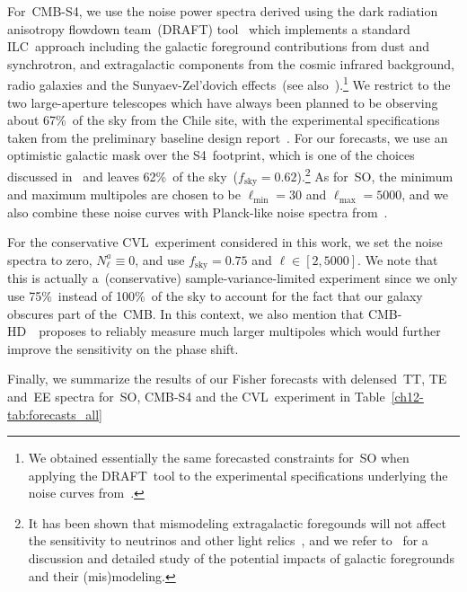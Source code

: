 \begin{subappendices}
For~\mbox{CMB-S4}, we use the noise power spectra derived using the dark radiation anisotropy flowdown team~(DRAFT) tool~\cite{CMB-S4:inprep, Raghunathan:draft} which implements a standard ILC~approach including the galactic foreground contributions from dust and synchrotron, and extragalactic components from the cosmic infrared background, radio galaxies and the Sunyaev-Zel'dovich effects~(see also~\cite{Raghunathan:2023yfe}).\footnote{We obtained essentially the same forecasted constraints for~SO when applying the DRAFT~tool to the experimental specifications underlying the noise curves from~\cite{SimonsObservatory:2020noise}.} We restrict to the two large-aperture telescopes which have always been planned to be observing about 67\%~of the sky from the Chile site, with the experimental specifications taken from the preliminary baseline design report~\cite{CMB-S4:pbdr}. For our forecasts, we use an optimistic galactic mask over the S4~footprint, which is one of the choices discussed in~\cite{CMB-S4:inprep, Raghunathan:inprep} and leaves 62\%~of the sky~($f_\mathrm{sky} = 0.62$).\footnote{It has been shown that mismodeling extragalactic foregounds will not affect the sensitivity to neutrinos and other light relics~\cite{Raghunathan:2023yfe}, and we refer to~\cite{CMB-S4:inprep, Raghunathan:inprep} for a discussion and detailed study of the potential impacts of galactic foregrounds and their (mis)modeling.} As for~SO, the minimum and maximum multipoles are chosen to be $\ell_\mathrm{min} = 30$ and $\ell_\mathrm{max} = 5000$, and we also combine these noise curves with Planck-like noise spectra from~\cite{Allison:2015qca}.

For the conservative CVL~experiment considered in this work, we set the noise spectra to zero, $N_\ell^a \equiv 0$, and use $f_\mathrm{sky} = 0.75$ and $\ell \in [2, 5000]$. We note that this is actually a~(conservative) sample-variance-limited experiment since we only use 75\%~instead of 100\%~of the sky to account for the fact that our galaxy obscures part of the~CMB. In this context, we also mention that \mbox{CMB-HD}~\cite{CMB-HD:2022bsz}~proposes to reliably measure much larger multipoles which would further improve the sensitivity on the phase shift.\medskip

Finally, we summarize the results of our Fisher forecasts with delensed~TT, TE and~EE spectra for~SO, \mbox{CMB-S4} and the CVL~experiment in Table~\ref{ch12-tab:forecasts_all}%
\begin{table}
	\centering\footnotesize\setlength{\tabcolsep}{4pt}
	\begin{subtable}{\textwidth}
		\centering


\end{subtable}
\end{table}
\end{subappendices}
